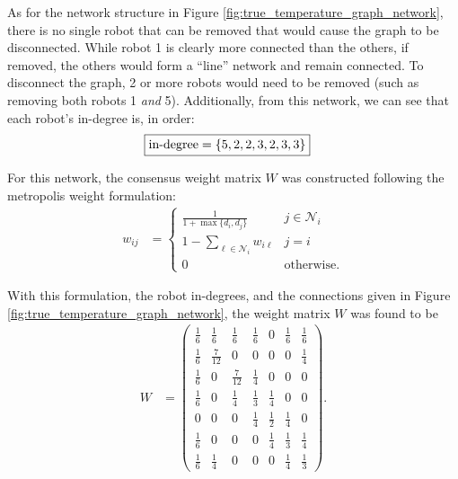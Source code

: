 \documentclass[12pt]{article}
\begin{document}
As for the network structure in Figure \ref{fig:true_temperature_graph_network}, there is no single robot that can be removed that would cause the graph to be disconnected. While robot 1 is clearly more connected than the others, if removed, the others would form a ``line'' network and remain connected. To disconnect the graph, 2 or more robots would need to be removed (such as removing both robots 1 \textit{and} 5). Additionally, from this network, we can see that each robot's in-degree is, in order:
\begin{align*}
    \Aboxed{\text{in-degree}&=\{5,2,2,3,2,3,3\}}
\end{align*}

For this network, the consensus weight matrix $W$ was constructed following the metropolis weight formulation:
\begin{align}\label{eqn:metropolis}
    w_{ij}&=\begin{cases}
        \frac{1}{1+\max\{d_i,d_j\}}& j\in\mathcal N_i\\
        1-\sum_{\ell\in\mathcal N_i}w_{i\ell} & j=i\\
        0 & \text{otherwise}.
    \end{cases}
\end{align}

With this formulation, the robot in-degrees, and the connections given in Figure \ref{fig:true_temperature_graph_network}, the weight matrix $W$ was found to be
\begin{align}\label{eqn:W}
    W&=\begin{pmatrix}
        \frac16 & \frac16 & \frac16 & \frac16 & 0 & \frac16 & \frac16\\
        \frac16 & \frac7{12} & 0 & 0 & 0 & 0 & \frac14\\
        \frac16 & 0 & \frac7{12} & \frac14 & 0 & 0 & 0\\
        \frac16 & 0 & \frac14 & \frac13 & \frac14 & 0 & 0\\
        0 & 0 & 0 & \frac14 & \frac12 & \frac14 & 0\\
        \frac16 & 0 & 0 & 0 & \frac14 & \frac13 & \frac14\\
        \frac16 & \frac14 & 0 & 0 & 0 & \frac14 & \frac13
    \end{pmatrix}.
\end{align}
\end{document}
